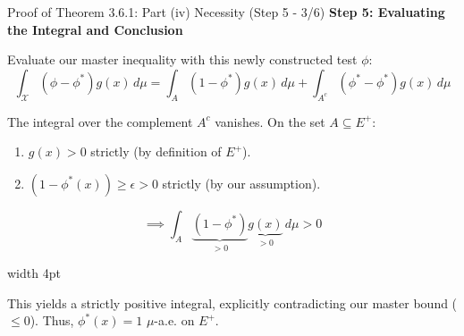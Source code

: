 \documentclass[10pt, aspectratio=169, xcolor=dvipsnames]{beamer}
\newcommand{\lead}[1]{{\color{UniBlue}\bfseries #1}}
\begin{document}
\begin{frame}{Proof of Theorem 3.6.1: Part (iv) Necessity (Step 5 - 3/6)}
    \lead{Step 5: Evaluating the Integral and Conclusion}\\
    \vspace{0.2cm}
    
    Evaluate our master inequality with this newly constructed test $\phi$:
    \[ \int_{\mathcal{X}} (\phi - \phi^*) g(x) \, d\mu = \int_A (1 - \phi^*) g(x) \, d\mu + \int_{A^c} (\phi^* - \phi^*) g(x) \, d\mu \]
    
    \vspace{0.2cm}
    The integral over the complement $A^c$ vanishes. On the set $A \subseteq E^+$:
    \vspace{0.1cm}
    \begin{enumerate}
        \item $g(x) > 0$ strictly (by definition of $E^+$).
        \item $(1 - \phi^*(x)) \ge \epsilon > 0$ strictly (by our assumption).
    \end{enumerate}
    
    \vspace{0.2cm}
    \[ \implies \int_A \underbrace{(1 - \phi^*)}_{> 0} \underbrace{g(x)}_{> 0} \, d\mu > 0 \]
    
    \vspace{0.1cm}
    \noindent
    {\color{Teal}\vrule width 4pt}%
    \hspace{10pt}%
    \begin{minipage}{\dimexpr\textwidth-14pt\relax}
        \color{Slate}
        This yields a strictly positive integral, explicitly contradicting our master bound ($\le 0$). Thus, $\phi^*(x) = 1$ $\mu$-a.e. on $E^+$.
        
    \end{minipage}
\end{frame}
\end{document}

